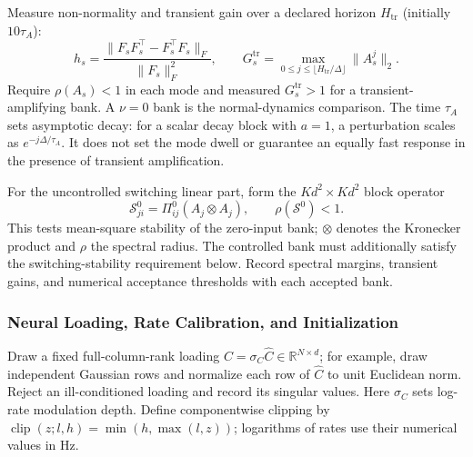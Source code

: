 Measure non-normality and transient gain over a declared horizon $H_{\mathrm{tr}}$ (initially $10\tau_A$):
\begin{equation}
 h_s=\frac{\|F_sF_s^{\top}-F_s^{\top}F_s\|_F}{\|F_s\|_F^2},\qquad
 G_s^{\mathrm{tr}}=\max_{0\le j\le\lfloor H_{\mathrm{tr}}/\Delta\rfloor}\|A_s^j\|_2.
 \label{eq:bank-transient}
\end{equation}
Require $\rho(A_s)<1$ in each mode and measured $G_s^{\mathrm{tr}}>1$ for a transient-amplifying bank. A $\nu=0$ bank is the normal-dynamics comparison. The time $\tau_A$ sets asymptotic decay: for a scalar decay block with $a=1$, a perturbation scales as $e^{-j\Delta/\tau_A}$. It does not set the mode dwell or guarantee an equally fast response in the presence of transient amplification.

For the uncontrolled switching linear part, form the $Kd^2\times Kd^2$ block operator
\begin{equation}
 \mathcal S^0_{ji}=\Pi^0_{ij}(A_j\otimes A_j),\qquad
 \rho(\mathcal S^0)<1.
 \label{eq:baseline-switch-stability}
\end{equation}
This tests mean-square stability of the zero-input bank; $\otimes$ denotes the Kronecker product and $\rho$ the spectral radius. The controlled bank must additionally satisfy the switching-stability requirement below. Record spectral margins, transient gains, and numerical acceptance thresholds with each accepted bank.

\subsubsection{Neural Loading, Rate Calibration, and Initialization}
Draw a fixed full-column-rank loading $C=\sigma_C\widehat C\in\mathbb R^{N\times d}$; for example, draw independent Gaussian rows and normalize each row of $\widehat C$ to unit Euclidean norm. Reject an ill-conditioned loading and record its singular values. Here $\sigma_C$ sets log-rate modulation depth. Define componentwise clipping by $\operatorname{clip}(z;l,h)=\min(h,\max(l,z))$; logarithms of rates use their numerical values in Hz.

